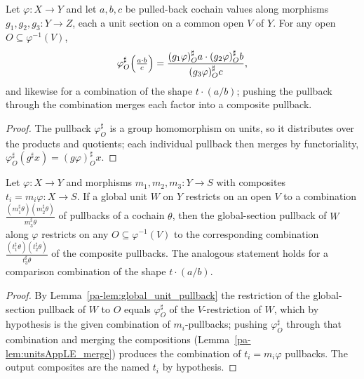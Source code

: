 \begin{lemma}
  \label{pa-lem:unitsAppLE_merge}
  \leanok

  Let \(\varphi \colon X \to Y\) and let \(a, b, c\) be pulled-back cochain values along
  morphisms \(g_1, g_2, g_3 \colon Y \to Z\), each a unit section on a common open \(V\) of
  \(Y\). For any open \(O \subseteq \varphi^{-1}(V)\),
  \[
    \varphi^{\sharp}_O\Bigl(\tfrac{a \cdot b}{c}\Bigr)
      = \frac{(g_1\varphi)^{\sharp}_O a \cdot (g_2\varphi)^{\sharp}_O b}{(g_3\varphi)^{\sharp}_O c},
  \]
  and likewise for a combination of the shape \(t \cdot (a/b)\); pushing the pullback through
  the combination merges each factor into a composite pullback.
\end{lemma}
\begin{proof}
  \leanok
  The pullback \(\varphi^{\sharp}_O\) is a group homomorphism on units, so it distributes over
  the products and quotients; each individual pullback then merges by functoriality,
  \(\varphi^{\sharp}_O(g^{\sharp} x) = (g\varphi)^{\sharp}_O x\).
\end{proof}

\begin{lemma}
  \label{pa-lem:unitsAppLE_glued_pullback}
  \leanok

  Let \(\varphi \colon X \to Y\) and morphisms \(m_1, m_2, m_3 \colon Y \to S\) with composites
  \(t_i = m_i \varphi \colon X \to S\). If a global unit \(W\) on \(Y\) restricts on an open
  \(V\) to a combination \(\tfrac{(m_1^{\sharp}\theta)(m_2^{\sharp}\theta)}{m_3^{\sharp}\theta}\)
  of pullbacks of a cochain \(\theta\), then the global-section pullback of \(W\) along
  \(\varphi\) restricts on any \(O \subseteq \varphi^{-1}(V)\) to the corresponding combination
  \(\tfrac{(t_1^{\sharp}\theta)(t_2^{\sharp}\theta)}{t_3^{\sharp}\theta}\) of the composite
  pullbacks. The analogous statement holds for a comparison combination of the shape
  \(t \cdot (a/b)\).
\end{lemma}
\begin{proof}
  \leanok
  By Lemma~\ref{pa-lem:global_unit_pullback} the restriction of the global-section pullback of
  \(W\) to \(O\) equals \(\varphi^{\sharp}_O\) of the \(V\)-restriction of \(W\), which by
  hypothesis is the given combination of \(m_i\)-pullbacks; pushing \(\varphi^{\sharp}_O\)
  through that combination and merging the compositions (Lemma~\ref{pa-lem:unitsAppLE_merge})
  produces the combination of \(t_i = m_i\varphi\) pullbacks. The output composites are the
  named \(t_i\) by hypothesis.
\end{proof}

